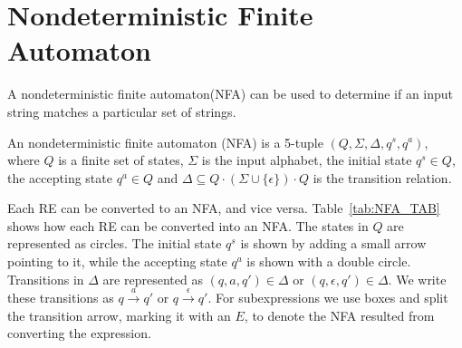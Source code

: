 \section{Nondeterministic Finite Automaton}\label{RA_TO_NFA}
A nondeterministic finite automaton(NFA) can be used to determine if an input string matches a particular set of strings.
\begin{mydef}
An nondeterministic finite automaton (NFA) is a 5-tuple $(Q,\Sigma,\Delta,q^s ,q^a)$, where $Q$ is a finite set of states, $\Sigma$ is the input alphabet, the initial state $q^s \in Q$,  the accepting state $q^a \in Q$ and $\Delta \subseteq Q \cdot (\Sigma \cup \{\epsilon\}) \cdot Q$ is the transition relation. 
\end{mydef}
Each RE can be converted to an NFA, and vice versa. Table~\ref{tab:NFA_TAB} shows how each RE can be converted into an NFA. The states in $Q$ are represented as circles. The initial state $q^s$ is shown by adding a small arrow pointing to it, while the accepting state $q^a$ is shown with a double circle. Transitions in $\Delta$ are represented as  $(q,a,q')\in \Delta$ or $(q,\epsilon ,q')\in\Delta$. We write these transitions as $q \xrightarrow{a} q'$ or $q \xrightarrow{\epsilon} q'$. For subexpressions we use boxes and split the transition arrow, marking it with an $E$, to denote the NFA resulted from converting the expression. 

